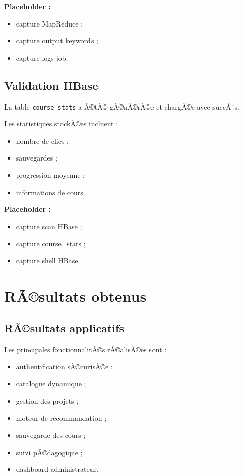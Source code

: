 ﻿\documentclass[12pt,a4paper]{report}
\begin{document}
\textbf{Placeholder :}
\begin{itemize}
    \item capture MapReduce ;
    \item capture output keywords ;
    \item capture logs job.
\end{itemize}

\subsection{Validation HBase}

La table \texttt{course\_stats} a Ã©tÃ© gÃ©nÃ©rÃ©e et chargÃ©e avec succÃ¨s.

Les statistiques stockÃ©es incluent :
\begin{itemize}
    \item nombre de clics ;
    \item sauvegardes ;
    \item progression moyenne ;
    \item informations de cours.
\end{itemize}

\vspace{0.3cm}

\textbf{Placeholder :}
\begin{itemize}
    \item capture scan HBase ;
    \item capture course\_stats ;
    \item capture shell HBase.
\end{itemize}

\section{RÃ©sultats obtenus}

\subsection{RÃ©sultats applicatifs}

Les principales fonctionnalitÃ©s rÃ©alisÃ©es sont :
\begin{itemize}
    \item authentification sÃ©curisÃ©e ;
    \item catalogue dynamique ;
    \item gestion des projets ;
    \item moteur de recommandation ;
    \item sauvegarde des cours ;
    \item suivi pÃ©dagogique ;
    \item dashboard administrateur.
\end{itemize}
\end{document}
